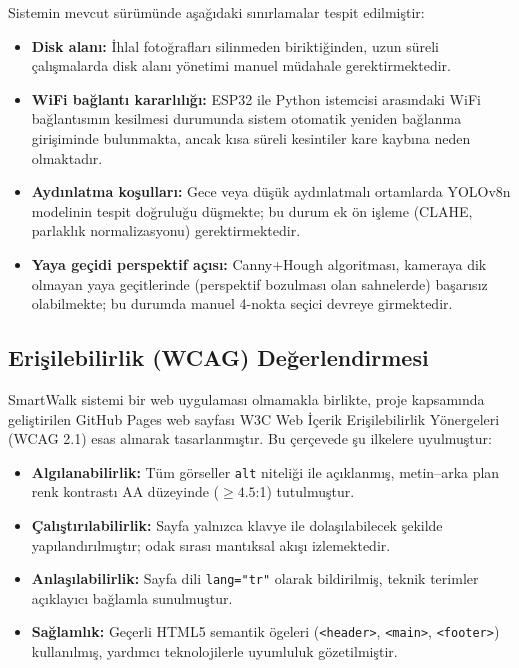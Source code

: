 Sistemin mevcut sürümünde aşağıdaki sınırlamalar tespit edilmiştir:

\begin{itemize}
  \item \textbf{Disk alanı:} İhlal fotoğrafları silinmeden biriktiğinden, uzun süreli çalışmalarda disk alanı yönetimi manuel müdahale gerektirmektedir.
  \item \textbf{WiFi bağlantı kararlılığı:} ESP32 ile Python istemcisi arasındaki WiFi bağlantısının kesilmesi durumunda sistem otomatik yeniden bağlanma girişiminde bulunmakta, ancak kısa süreli kesintiler kare kaybına neden olmaktadır.
  \item \textbf{Aydınlatma koşulları:} Gece veya düşük aydınlatmalı ortamlarda YOLOv8n modelinin tespit doğruluğu düşmekte; bu durum ek ön işleme (CLAHE, parlaklık normalizasyonu) gerektirmektedir.
  \item \textbf{Yaya geçidi perspektif açısı:} Canny+Hough algoritması, kameraya dik olmayan yaya geçitlerinde (perspektif bozulması olan sahnelerde) başarısız olabilmekte; bu durumda manuel 4-nokta seçici devreye girmektedir.
\end{itemize}

\subsection{Erişilebilirlik (WCAG) Değerlendirmesi}

SmartWalk sistemi bir web uygulaması olmamakla birlikte, proje kapsamında geliştirilen GitHub Pages web sayfası W3C Web İçerik Erişilebilirlik Yönergeleri (WCAG 2.1) \cite{wcag2018} esas alınarak tasarlanmıştır. Bu çerçevede şu ilkelere uyulmuştur:

\begin{itemize}
  \item \textbf{Algılanabilirlik:} Tüm görseller \texttt{alt} niteliği ile açıklanmış, metin–arka plan renk kontrastı AA düzeyinde ($\geq 4.5$:1) tutulmuştur.
  \item \textbf{Çalıştırılabilirlik:} Sayfa yalnızca klavye ile dolaşılabilecek şekilde yapılandırılmıştır; odak sırası mantıksal akışı izlemektedir.
  \item \textbf{Anlaşılabilirlik:} Sayfa dili \texttt{lang="tr"} olarak bildirilmiş, teknik terimler açıklayıcı bağlamla sunulmuştur.
  \item \textbf{Sağlamlık:} Geçerli HTML5 semantik ögeleri (\texttt{<header>}, \texttt{<main>}, \texttt{<footer>}) kullanılmış, yardımcı teknolojilerle uyumluluk gözetilmiştir.
\end{itemize}

